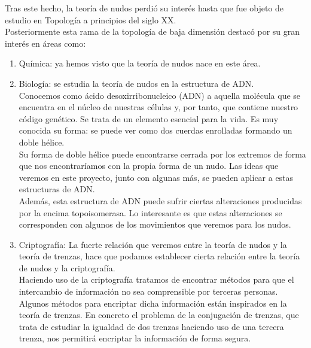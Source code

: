 \documentclass[14pt]{extarticle}
\begin{document}
Tras este hecho, la teoría de nudos perdió su interés hasta que fue objeto de estudio en Topología a principios del siglo XX.\\

Posteriormente esta rama de la topología de baja dimensión destacó por su gran interés en áreas como:
  \begin{enumerate}
  	\item Química: ya hemos visto que la teoría de nudos nace en este área.
  	\item Biología: se estudia la teoría de nudos en la estructura de ADN.\\
  	Conocemos como ácido desoxirribonucleico (ADN) a aquella molécula que se encuentra en el núcleo de nuestras células y, por tanto, que contiene nuestro código genético. Se trata de un elemento esencial para la vida. Es muy conocida su forma: se puede ver como dos cuerdas enrolladas formando un doble hélice. \\
  	
  	Su forma de doble hélice puede encontrarse cerrada por los extremos de forma que nos encontraríamos con la propia forma de un nudo. Las ideas que veremos en este proyecto, junto con algunas más, se pueden aplicar a estas estructuras de ADN.\\
  	
  	Además, esta estructura de ADN puede sufrir ciertas alteraciones producidas por la encima topoisomerasa. Lo interesante es que estas alteraciones se corresponden con algunos de los movimientos que veremos para los nudos.\\
  	
  	
  	\item Criptografía: 
  	La fuerte relación que veremos entre la teoría de nudos y la teoría de trenzas, hace que podamos establecer cierta relación entre la teoría de nudos y la criptografía. \\
  	
  	Haciendo uso de la criptografía tratamos de encontrar métodos para que el intercambio de información no sea comprensible por terceras personas.\\
  	
  	Algunos métodos para encriptar dicha información están inspirados en la teoría de trenzas. En concreto el problema de la conjugación de trenzas, que trata de estudiar la igualdad de dos trenzas haciendo uso de una tercera trenza, nos permitirá encriptar la información de forma segura. \\
  \end{enumerate}
\end{document}
